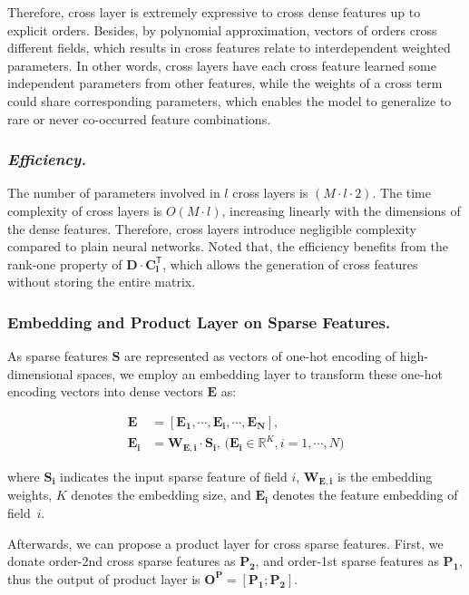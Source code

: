 \documentclass[letterpaper]{article} \usepackage{aaai21}  \usepackage{times}  \usepackage{helvet} \usepackage{courier}  \usepackage[hyphens]{url}  \usepackage{graphicx} \urlstyle{rm} \def\UrlFont{\rm}  \usepackage{natbib}  \usepackage{caption} \frenchspacing  \setlength{\pdfpagewidth}{8.5in}  \setlength{\pdfpageheight}{11in}  \usepackage{graphicx}
\begin{document}
Therefore, cross layer is extremely expressive to cross dense features up to explicit orders. Besides, by polynomial approximation, vectors of orders cross different fields, which results in cross features relate to interdependent weighted parameters. In other words, cross layers have each cross feature learned some independent parameters from other features, while the weights of a cross term could share corresponding parameters, which enables the model to generalize to rare or never co-occurred feature combinations.


\subsubsection{{\em Efficiency.}} The number of parameters involved in $l$ cross layers is $(M \cdot l \cdot 2)$. The time complexity of cross layers is $O(M \cdot l)$, increasing linearly with the dimensions of the dense features. Therefore, cross layers introduce negligible complexity compared to plain neural networks. Noted that, the efficiency benefits from the rank-one property of $\bm{D} \cdot \bm{C_{l}^{\mathsf{T}}}$, which allows the generation of cross features without storing the entire matrix.


\subsubsection{Embedding and Product Layer on Sparse Features.}
As sparse features $\bm{S}$ are represented as vectors of one-hot encoding of high-dimensional spaces, we employ an embedding layer to transform these one-hot encoding vectors into dense vectors $\bm{E}$ as:
\begin{small}
\begin{equation}
\begin{aligned}
	\bm{E} &= [\bm{E_1}, \cdots, \bm{E_i}, \cdots, \bm{E_N}], \\
	\bm{E_i} &= \bm{W_{E,i}} \cdot \bm{S_i}, \, \big( \bm{E_i} \in \mathbb{R}^K, i=1, \cdots, N \big)
\end{aligned}
\end{equation}
\end{small}where $\bm{S_i}$ indicates the input sparse feature of field $i$, $\bm{W_{E,i}}$ is the embedding weights, $K$ denotes the embedding size, and $\bm{E_i}$ denotes the feature embedding of field~$i$.

Afterwards, we can propose a product layer for cross sparse features. First, we donate order-2nd cross sparse features as $\bm{P_2}$, and order-1st sparse features as $\bm{P_1}$, thus the output of product layer is $\bm{O^P} = [\bm{P_1}; \bm{P_2}]$.
\end{document}
